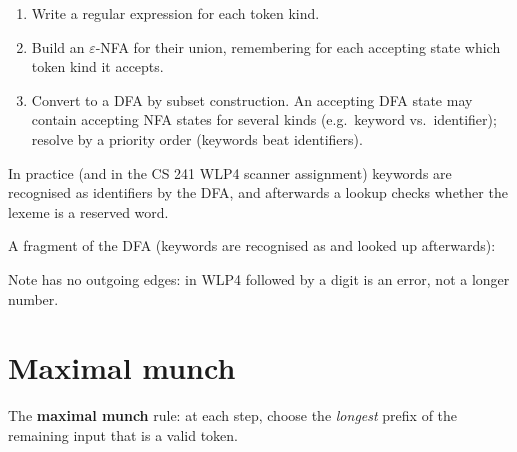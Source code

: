 \begin{enumerate}
  \item Write a regular expression for each token kind.
  \item Build an $\varepsilon$-NFA for their union, remembering for each accepting state which
        token kind it accepts.
  \item Convert to a DFA by subset construction. An accepting DFA state may contain accepting
        NFA states for several kinds (e.g.\ keyword  vs.\ identifier); resolve by a
        priority order (keywords beat identifiers).
\end{enumerate}

In practice (and in the CS 241 WLP4 scanner assignment) keywords are recognised as
identifiers by the DFA, and afterwards a lookup checks whether the lexeme is a reserved word.

\begin{example}
A fragment of the DFA (keywords are recognised as  and looked up afterwards):
\begin{center}
\end{center}
Note  has no outgoing edges: in WLP4  followed by a digit is an error,
not a longer number.
\end{example}

\section{Maximal munch}

\begin{definition}
The \textbf{maximal munch} rule: at each step, choose the \emph{longest} prefix of the
remaining input that is a valid token.
\end{definition}

